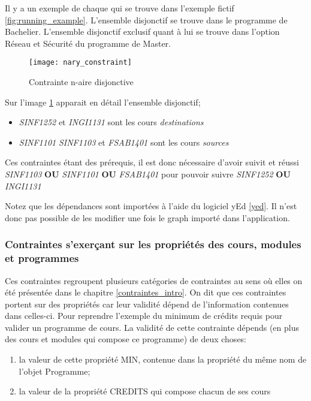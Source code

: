 Il y a un exemple de chaque qui se trouve dans l'exemple fictif \ref{fig:running_example}. L'ensemble disjonctif se trouve dans le programme de Bachelier. L'ensemble disjonctif exclusif quant à lui se trouve dans l'option Réseau et Sécurité du programme de Master.

\begin{figure}
\centering
\caption{Contrainte n-aire disjonctive}
\label{fig:nary_constraint}
\texttt{[image: nary\_constraint]}
\end{figure}


Sur l'image \ref{fig:nary_constraint} apparait en détail l'ensemble disjonctif;
\begin{itemize}
  \item \textit{SINF1252} et \textit{INGI1131} sont les cours \textit{destinations}
  \item \textit{SINF1101} \textit{SINF1103} et \textit{FSAB1401} sont les cours \textit{sources}
\end{itemize}

Ces contraintes étant des prérequis, il est donc nécessaire d'avoir suivit et réussi \textit{SINF1103} \textbf{OU} \textit{SINF1101} \textbf{OU} \textit{FSAB1401} pour pouvoir suivre \textit{SINF1252} \textbf{OU} \textit{INGI1131}

Notez que les dépendances sont importées à l'aide du logiciel yEd \ref{yed}. Il n'est donc pas possible de les modifier une fois le graph importé dans l'application. 
\subsubsection{Contraintes s’exerçant sur les propriétés des cours, modules et programmes}
\label{properties}
Ces contraintes regroupent plusieurs catégories de contraintes au sens où elles on été présentée dans le chapitre \ref{contraintes_intro}. On dit que ces contraintes portent sur des propriétés car leur validité dépend de l'information contenues dans celles-ci. Pour reprendre l'exemple du minimum de crédits requis pour valider un programme de cours. La validité de cette contrainte dépends (en plus des cours et modules qui compose ce programme) de deux choses:
\begin{enumerate}
  \item la valeur de cette propriété MIN, contenue dans la propriété du même nom de l'objet Programme;
  \item la valeur de la propriété CREDITS qui compose chacun de ses cours
\end{enumerate}


